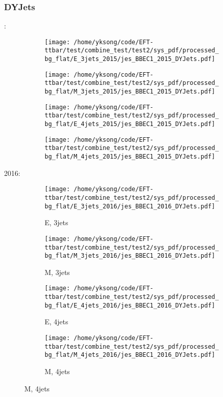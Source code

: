 \documentclass{beamer}
\begin{document}
\begin{frame}
\frametitle{DYJets}
\fontsize{5}{1}:
\begin{figure}
\centering
\begin{subfigure}[b]{0.24\textwidth}
\texttt{[image: /home/yksong/code/EFT-ttbar/test/combine\_test/test2/sys\_pdf/processed\_bg\_flat/E\_3jets\_2015/jes\_BBEC1\_2015\_DYJets.pdf]}
\end{subfigure}
\begin{subfigure}[b]{0.24\textwidth}
\texttt{[image: /home/yksong/code/EFT-ttbar/test/combine\_test/test2/sys\_pdf/processed\_bg\_flat/M\_3jets\_2015/jes\_BBEC1\_2015\_DYJets.pdf]}
\end{subfigure}
\begin{subfigure}[b]{0.24\textwidth}
\texttt{[image: /home/yksong/code/EFT-ttbar/test/combine\_test/test2/sys\_pdf/processed\_bg\_flat/E\_4jets\_2015/jes\_BBEC1\_2015\_DYJets.pdf]}
\end{subfigure}
\begin{subfigure}[b]{0.24\textwidth}
\texttt{[image: /home/yksong/code/EFT-ttbar/test/combine\_test/test2/sys\_pdf/processed\_bg\_flat/M\_4jets\_2015/jes\_BBEC1\_2015\_DYJets.pdf]}
\end{subfigure}
\end{figure}
2016:
\begin{figure}
\centering
\begin{subfigure}[b]{0.24\textwidth}
\texttt{[image: /home/yksong/code/EFT-ttbar/test/combine\_test/test2/sys\_pdf/processed\_bg\_flat/E\_3jets\_2016/jes\_BBEC1\_2016\_DYJets.pdf]}
\captionsetup{font=tiny}
\caption{E, 3jets}
\end{subfigure}
\begin{subfigure}[b]{0.24\textwidth}
\texttt{[image: /home/yksong/code/EFT-ttbar/test/combine\_test/test2/sys\_pdf/processed\_bg\_flat/M\_3jets\_2016/jes\_BBEC1\_2016\_DYJets.pdf]}
\captionsetup{font=tiny}
\caption{M, 3jets}
\end{subfigure}
\begin{subfigure}[b]{0.24\textwidth}
\texttt{[image: /home/yksong/code/EFT-ttbar/test/combine\_test/test2/sys\_pdf/processed\_bg\_flat/E\_4jets\_2016/jes\_BBEC1\_2016\_DYJets.pdf]}
\captionsetup{font=tiny}
\caption{E, 4jets}
\end{subfigure}
\begin{subfigure}[b]{0.24\textwidth}
\texttt{[image: /home/yksong/code/EFT-ttbar/test/combine\_test/test2/sys\_pdf/processed\_bg\_flat/M\_4jets\_2016/jes\_BBEC1\_2016\_DYJets.pdf]}
\captionsetup{font=tiny}
\caption{M, 4jets}
\end{subfigure}
\end{figure}
\end{frame}
\end{document}
